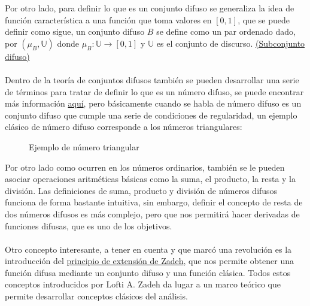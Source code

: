 Por otro lado, para definir lo que es un conjunto difuso se generaliza la idea de función característica a una función que toma valores en $[0, 1]$, que se puede definir como sigue, un conjunto difuso $B$ se define como un par ordenado dado, por $(\mu_B, \mathbb{U})$ donde $\mu_B : \mathbb{U} \longrightarrow [0,1]$ y $\mathbb{U}$ es el conjunto de discurso. \hyperref[def:subconjunto_difuso]{(Subconjunto difuso)} \\ \\
Dentro de la teoría de conjuntos difusos también se pueden desarrollar una serie de términos para tratar de definir lo que es un número difuso, se puede encontrar más información \hyperref[def:numero_difuso]{aquí}, pero básicamente cuando se habla de número difuso es un conjunto difuso que cumple una serie de condiciones de regularidad, un ejemplo clásico de número difuso corresponde a los números triangulares:
\begin{figure}[H]
	\centering
	\caption{Ejemplo de número triangular}
\end{figure}
Por otro lado como ocurren en los números ordinarios, también se le pueden asociar operaciones aritméticas básicas como la suma, el producto, la resta y la división. Las definiciones de suma, producto y división de números difusos funciona de forma bastante intuitiva, sin embargo, definir el concepto de resta de dos números difusos es más complejo, pero que nos permitirá hacer derivadas de funciones difusas, que es uno de los objetivos.
\\ \\
Otro concepto interesante, a tener en cuenta y que marcó una revolución es la introducción del \hyperref[def:zadeh]{principio de extensión de Zadeh}, que nos permite obtener una función difusa mediante un conjunto difuso y una función clásica. Todos estos conceptos introducidos por Lofti A. Zadeh da lugar a un marco teórico que permite desarrollar conceptos clásicos del análisis.

